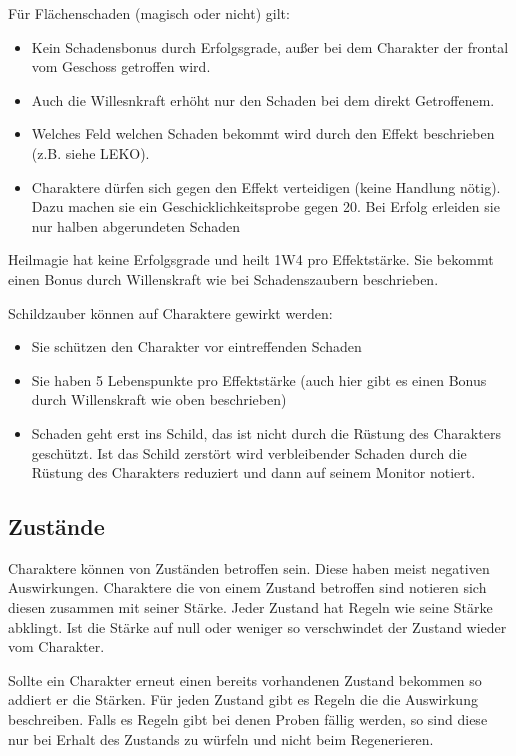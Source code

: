 \documentclass{article}
\begin{document}
Für Flächenschaden (magisch oder nicht) gilt:

\begin{itemize}
\item Kein Schadensbonus durch Erfolgsgrade, außer bei dem Charakter der frontal vom Geschoss getroffen wird.
\item Auch die Willesnkraft erhöht nur den Schaden bei dem direkt Getroffenem.
\item Welches Feld welchen Schaden bekommt wird durch den Effekt beschrieben (z.B. siehe LEKO).
\item Charaktere dürfen sich gegen den Effekt verteidigen (keine Handlung nötig). Dazu machen sie ein Geschicklichkeitsprobe gegen 20. Bei Erfolg erleiden sie nur halben abgerundeten Schaden
\end{itemize}

Heilmagie hat keine Erfolgsgrade und heilt 1W4 pro Effektstärke. Sie bekommt einen Bonus durch Willenskraft wie
bei Schadenszaubern beschrieben.

Schildzauber können auf Charaktere gewirkt werden:

\begin{itemize}
\item Sie schützen den Charakter vor eintreffenden Schaden
\item Sie haben 5 Lebenspunkte pro Effektstärke (auch hier gibt es einen Bonus durch Willenskraft wie oben beschrieben)
\item Schaden geht erst ins Schild, das ist nicht durch die Rüstung des Charakters geschützt. Ist das Schild zerstört wird verbleibender Schaden durch die Rüstung des Charakters reduziert und dann auf seinem Monitor notiert.
\end{itemize}

\begin{center}
\subsection{Zustände}
\end{center}

Charaktere können von Zuständen betroffen sein. Diese haben meist negativen Auswirkungen. Charaktere die von einem
Zustand betroffen sind notieren sich diesen zusammen mit seiner Stärke. Jeder Zustand hat Regeln wie seine Stärke
abklingt. Ist die Stärke auf null oder weniger so verschwindet der Zustand wieder vom Charakter.

Sollte ein Charakter erneut einen bereits vorhandenen Zustand bekommen so addiert er die Stärken. Für jeden Zustand
gibt es Regeln die die Auswirkung beschreiben. Falls es Regeln gibt bei denen Proben fällig werden, so sind diese nur
bei Erhalt des Zustands zu würfeln und nicht beim Regenerieren.
\end{document}

